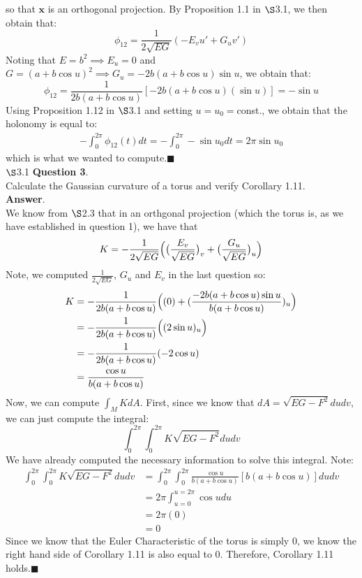 \documentclass{article}
\begin{document}
    so that $\mathbf{x}$ is an orthogonal projection. By Proposition 1.1 in $\S$3.1, we then obtain that:
    \[ \phi_{12} = \frac{1}{2\sqrt{EG}}(-E_vu' + G_uv') \]
    Noting that $E = b^2 \implies E_u = 0$ and $G = (a+b\cos{u})^2 \implies G_u = -2b(a+b\cos{u})\sin{u}$, we obtain that:
    \[ \phi_{12} = \frac{1}{2b(a+b\cos{u})}[-2b(a+b\cos{u})(\sin{u})] = -\sin{u} \]
    Using Proposition 1.12 in $\S$3.1 and setting $u=u_0=$const., we obtain that the holonomy is equal to:
    \begin{align*}
        -\int_0^{2\pi} \phi_{12}(t)dt = -\int_0^{2\pi} -\sin{u_0}dt = 2\pi\sin{u_0}
    \end{align*}
    which is what we wanted to compute.\hfill$\blacksquare$\\

    $\S$3.1 \textbf{Question 3}.\\
    Calculate the Gaussian curvature of a torus and verify Corollary 1.11.\\

    \textbf{Answer}.\\
    We know from $\S$2.3 that in an orthgonal projection (which the torus is, as we have established in question 1), we have that
    \[ K = -\frac{1}{2\sqrt{EG}}\Big{(}\big{(}\frac{E_v}{\sqrt{EG}}\big{)}_v + \big{(}\frac{G_u}{\sqrt{EG}}\big{)}_u\Big{)} \]
    Note, we computed $\frac{1}{2\sqrt{EG}}$, $G_u$ and $E_v$ in the last question so:
    \begin{align*}
        K &= -\frac{1}{2b(a+b\cos{u})}\Big{(}(0) + (\frac{-2b(a+b\cos{u})\sin{u}}{b(a+b\cos{u})})_u\Big{)} \\
        &= -\frac{1}{2b(a+b\cos{u})}\Big{(}(2\sin{u})_u\Big{)} \\
        &= -\frac{1}{2b(a+b\cos{u})}(-2\cos{u}) \\
        &= \frac{\cos{u}}{b(a+b\cos{u})}
    \end{align*}
    Now, we can compute $\int_M KdA$. First, since we know that $dA = \sqrt{EG-F^2}dudv$, we can just compute the integral:
    \[ \int_0^{2\pi}\int_0^{2\pi} K\sqrt{EG-F^2}dudv \]
    We have already computed the necessary information to solve this integral. Note:
    \begin{align*}
        \int_0^{2\pi}\int_0^{2\pi}K\sqrt{EG-F^2}dudv &= \int_0^{2\pi}\int_0^{2\pi} \frac{\cos{u}}{b(a+b\cos{u})}[b(a+b\cos{u})]dudv \\
        &= 2\pi\int_{u=0}^{u=2\pi}\cos{u}du \\
        &= 2\pi (0) \\
        &= 0
    \end{align*}
    Since we know that the Euler Characteristic of the torus is simply 0, we know the right hand side of Corollary 1.11 is also
    equal to 0. Therefore, Corollary 1.11 holds.\hfill$\blacksquare$\\
\end{document}
